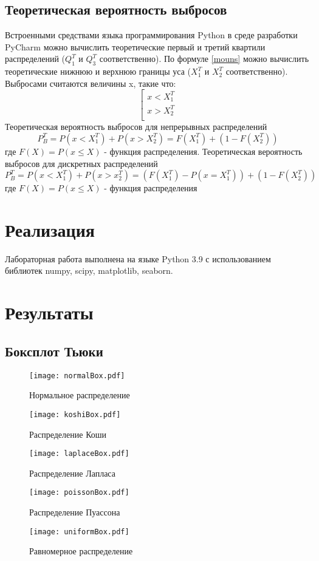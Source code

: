 \documentclass[a4paper,12pt]{article} %
\begin{document}
\subsection{Теоретическая вероятность выбросов}
	\noindent Встроенными средствами языка программирования Python в среде разработки PyCharm можно вычислить теоретические первый и третий квартили распределений ($Q_1^T$ и $Q_3^T$ соответственно). По формуле \eqref{mouns} можно вычислить теоретические нижнюю и верхнюю границы уса ($X_1^T$ и $X_2^T$ соответственно). Выбросами считаются величины x, такие что: 
	\begin{equation}
		\left[
		\begin{gathered}
		x < X_1^T \\
		x > X_2^T \\
		\end{gathered}
		\right.
	\end{equation}
	Теоретическая вероятность выбросов для непрерывных распределений
	\begin{equation}
		P_B^T = P(x<X_1^T) + P(x>X_2^T)=F(X_1^T) + (1-F(X_2^T))
	\end{equation}
	где $F(X)=P(x\leq{X})$ - функция распределения.
	Теоретическая вероятность выбросов для дискретных распределений
	\begin{equation}
		P_B^T = P(x<X_1^T)+P(x>x_2^T)=(F(X_1^T)-P(x=X_1^T))+(1-F(X_2^T))
	\end{equation}
	где $F(X) = P(x\leq{X})$ - функция распределения
\section{Реализация}
Лабораторная работа выполнена на языке Python 3.9 с использованием библиотек numpy, scipy, matplotlib, seaborn.
\section{Результаты}
\subsection{Боксплот Тьюки}
\begin{figure}[H]
    \centering
    \texttt{[image: normalBox.pdf]}
    \caption{Нормальное распределение}
    \label{fig:norm}
\end{figure}
\begin{figure}[H]
    \centering
    \texttt{[image: koshiBox.pdf]}
    \caption{Распределение Коши}
    \label{fig:cauchy}
\end{figure}
\begin{figure}[H]
    \centering
    \texttt{[image: laplaceBox.pdf]}
    \caption{Распределение Лапласа}
    \label{fig:laplace}
\end{figure}
\begin{figure}[H]
    \centering
    \texttt{[image: poissonBox.pdf]}
    \caption{Распределение Пуассона}
    \label{fig:poisson}
\end{figure}
\begin{figure}[H]
    \centering
    \texttt{[image: uniformBox.pdf]}
    \caption{Равномерное распределение}
    \label{fig:uniform}
\end{figure}
\end{document}
